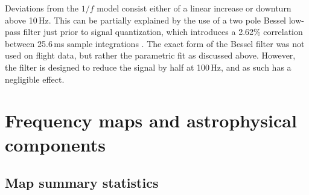 \documentclass[twocolumn]{../../common/aa}
\begin{document}
Deviations from the $1/f$ model consist either of a linear increase or downturn
above 10\,Hz. This can be partially explained by the use of a two pole Bessel
low-pass filter just prior to signal quantization, which introduces a 2.62\%
correlation between 25.6\,ms sample integrations
\citep[][Sect.~5.3]{jarosik2003:MAP}. The exact form of the Bessel filter was
not used on flight data, but rather the parametric fit as discussed above.
However, the filter is designed to reduce the signal by half at 100\,Hz, and as
such has a negligible effect. 





\lipsum[1-4]



\section{Frequency maps and astrophysical components}
\label{sec:maps}

\subsection{Map summary statistics}
\end{document}
